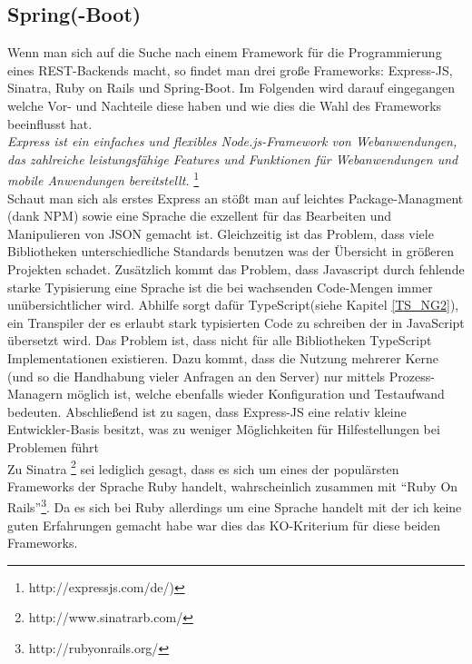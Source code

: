 \subsection{Spring(-Boot)}

Wenn man sich auf die Suche nach einem Framework für die Programmierung eines REST-Backends macht, so findet man drei große Frameworks: Express-JS, Sinatra, Ruby on Rails und Spring-Boot. Im Folgenden wird darauf eingegangen welche Vor- und Nachteile diese haben und wie dies die Wahl des Frameworks beeinflusst hat. \\

\emph{\glqq   
Express ist ein einfaches und flexibles Node.js-Framework von Webanwendungen, das zahlreiche leistungsfähige Features und Funktionen für Webanwendungen und mobile Anwendungen bereitstellt.
\grqq} \footnote{http://expressjs.com/de/)} \\

Schaut man sich als erstes Express an stößt man auf leichtes Package-Managment (dank NPM) sowie eine Sprache die exzellent für das Bearbeiten und Manipulieren von JSON gemacht ist. Gleichzeitig ist das Problem, dass viele Bibliotheken unterschiedliche Standards benutzen was der Übersicht in größeren Projekten schadet. Zusätzlich kommt das Problem, dass Javascript durch fehlende starke Typisierung eine Sprache ist die bei wachsenden Code-Mengen immer unübersichtlicher wird.
Abhilfe sorgt dafür TypeScript(siehe Kapitel \ref{TS_NG2}), ein Transpiler der es erlaubt stark typisierten Code zu schreiben der in JavaScript übersetzt wird. Das Problem ist, dass nicht für alle Bibliotheken TypeScript Implementationen existieren. Dazu kommt, dass die Nutzung mehrerer Kerne (und so die Handhabung vieler Anfragen an den Server) nur mittels Prozess-Managern möglich ist, welche ebenfalls wieder Konfiguration und Testaufwand bedeuten. Abschließend ist zu sagen, dass Express-JS eine relativ kleine Entwickler-Basis besitzt, was zu weniger Möglichkeiten für Hilfestellungen bei Problemen führt \\

Zu Sinatra \footnote{http://www.sinatrarb.com/} sei lediglich gesagt, dass es sich um eines der populärsten Frameworks der Sprache Ruby handelt, wahrscheinlich zusammen mit ``Ruby On Rails''\footnote{http://rubyonrails.org/}. Da es sich bei Ruby allerdings um eine Sprache handelt mit der ich keine guten Erfahrungen gemacht habe war dies das KO-Kriterium für diese beiden Frameworks. \\

